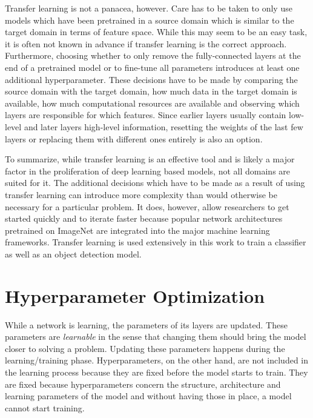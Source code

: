 \documentclass[final]{vutinfth} %
\begin{document}
Transfer learning is not a panacea, however. Care has to be taken to
only use models which have been pretrained in a source domain which is
similar to the target domain in terms of feature space. While this may
seem to be an easy task, it is often not known in advance if transfer
learning is the correct approach. Furthermore, choosing whether to
only remove the fully-connected layers at the end of a pretrained
model or to fine-tune all parameters introduces at least one
additional hyperparameter. These decisions have to be made by
comparing the source domain with the target domain, how much data in
the target domain is available, how much computational resources are
available and observing which layers are responsible for which
features. Since earlier layers usually contain low-level and later
layers high-level information, resetting the weights of the last few
layers or replacing them with different ones entirely is also an
option.

To summarize, while transfer learning is an effective tool and is
likely a major factor in the proliferation of deep learning based
models, not all domains are suited for it. The additional decisions
which have to be made as a result of using transfer learning can
introduce more complexity than would otherwise be necessary for a
particular problem. It does, however, allow researchers to get started
quickly and to iterate faster because popular network architectures
pretrained on ImageNet are integrated into the major machine learning
frameworks. Transfer learning is used extensively in this work to
train a classifier as well as an object detection model.

\section{Hyperparameter Optimization}
\label{sec:background-hypopt}

While a network is learning, the parameters of its layers are
updated. These parameters are \emph{learnable} in the sense that
changing them should bring the model closer to solving a
problem. Updating these parameters happens during the
learning/training phase. Hyperparameters, on the other hand, are not
included in the learning process because they are fixed before the
model starts to train. They are fixed because hyperparameters concern
the structure, architecture and learning parameters of the model and
without having those in place, a model cannot start training.
\end{document}
